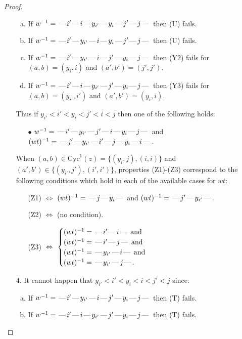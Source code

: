 \documentclass[10pt]{article}
\theoremstyle{definition}
\theoremstyle{definition}
\def\dash{\text{\hspace{0.5mm}---\hspace{0.5mm}}}
\def\Cyc{\mathrm{Cyc}}
\begin{document}
\begin{proof}
\begin{enumerate}
\begin{enumerate}[(a)]
\item If $w^{-1} = \dash i'\dash i\dash y_{i'}\dash y_i\dash j'\dash j\dash $ then (U) fails.
\item If $w^{-1} = \dash i'\dash y_{i'}\dash i\dash y_i\dash j'\dash j\dash $ then (U) fails.
\item If $w^{-1} = \dash i'\dash y_{i'}\dash i\dash j'\dash y_i\dash j\dash $ then (Y2) fails for $(a,b)=(y_i,i)$ and $(a',b')=(j',j')$.
\item If $w^{-1} = \dash i'\dash i\dash y_{i'}\dash j'\dash y_i\dash j\dash $ then (Y3) fails for $(a,b)=(y_{i'},i')$ and $(a',b')=(y_i,i)$.
\end{enumerate}
Thus if $y_{i'} < i' < y_i < j' < i < j$ then one of the following holds:
\begin{enumerate}
\item[$\bullet$] $w^{-1} = \dash i'\dash y_{i'}\dash j'\dash i\dash y_i\dash j\dash $ and $(wt)^{-1} = \dash j'\dash y_{i'}\dash i'\dash j\dash y_i\dash i\dash $.
\end{enumerate}
When $(a,b)\in\Cyc^1(z)=\{(y_i,j),(i,i)\}$ and $(a',b')\in\{(y_{i'},j'),(i',i')\}$,
properties (Z1)-(Z3) correspond to the following conditions which
hold in each of the available cases for $wt$:
\begin{enumerate}
\item[](Z1) $\Leftrightarrow$ $(wt)^{-1} = \dash j \dash y_i \dash$  and $(wt)^{-1} = \dash j' \dash y_{i'} \dash$.
\item[](Z2) $\Leftrightarrow$ (no condition).
\item[](Z3) $\Leftrightarrow$ $\begin{cases}\text{$(wt)^{-1} = \dash i' \dash i \dash$}\text{ and }\\
\text{$(wt)^{-1} = \dash i' \dash j \dash$}\text{ and }\\
\text{$(wt)^{-1} = \dash y_{i'} \dash i \dash$}\text{ and }\\
\text{$(wt)^{-1} = \dash y_{i'} \dash j \dash$}.\end{cases}$
\end{enumerate}
\item[$4$.] It cannot happen that $y_{i'} < i' < y_i < i < j' < j$ since:
\begin{enumerate}[(a)]
\item If $w^{-1} = \dash i'\dash y_{i'}\dash i\dash j'\dash y_i\dash j\dash $ then (T) fails.
\item If $w^{-1} = \dash i'\dash i\dash y_{i'}\dash j'\dash y_i\dash j\dash $ then (T) fails.

\end{enumerate}
\end{enumerate}
\end{proof}
\end{document}
